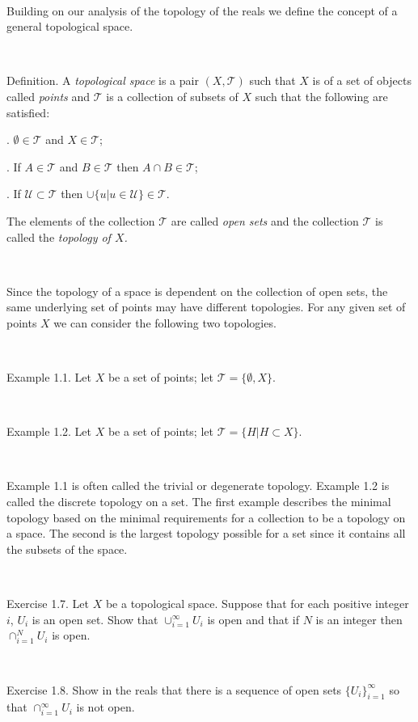 \documentclass[12pt, std]{article}
\begin{document}
\

Building on our analysis of the topology of the reals we define the
concept of a general topological space.

\

Definition. A \textit{topological space} is a pair $(X,
\mathcal{T})$ such that $X$ is of a set of objects called
\textit{points} and $\mathcal{T}$ is a collection of subsets of $X$
such that the following are satisfied:

.  $\emptyset \in \mathcal{T}$ and $X \in \mathcal{T}$;

.  If $A \in \mathcal{T}$ and $B \in \mathcal{T}$ then $A
\cap B \in \mathcal{T}$;

.  If $ \mathcal{U} \subset \mathcal{T}$ then $ \cup \{u | u
\in \mathcal{U} \} \in \mathcal{T} $.

\noindent The elements of the collection $\mathcal{T}$ are called \textit{open
sets} and the collection $\mathcal{T}$ is called the
\textit{topology of $X$.}

\

Since the topology of a space is dependent on the collection of open
sets, the same underlying set of points may have different
topologies.  For any given set of points $X$ we can consider the
following two topologies.

\

Example 1.1.  Let $X$ be a set of points; let $\mathcal{T} = \{
\emptyset, X \}$.

\

Example 1.2.  Let $X$ be a set of points; let $\mathcal{T} = \{ H |
H \subset X \}$.

\

Example 1.1 is often called the trivial or degenerate topology.
Example 1.2 is called the discrete topology on a set.  The first
example describes the minimal topology based on the minimal
requirements for a collection to be a topology on a space.  The
second is the largest topology possible for a set since it contains
all the subsets of the space.

\

Exercise 1.7.  Let $X$ be a topological space.  Suppose that for each
positive integer $i$,  $U_i$ is an open set.  Show that $\cup_{i=1}^{\infty}
U_i$ is open and that if $N$ is an integer then $\cap_{i=1}^{N} U_i$
is open.

\

Exercise 1.8.  Show in the reals that there is a sequence of open
sets $\{U_i\}_{i=1}^{\infty}$ so that $\cap_{i=1}^{\infty} U_i$ is
not open.
\end{document}
